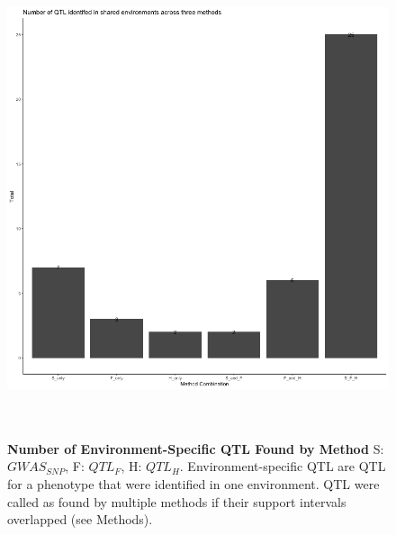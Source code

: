 \documentclass[article,9pt,twocolumn,twoside]{rilabRxiv}
\begin{document}
\begin{figure}[ht]
\centering
\includegraphics[width=\textwidth,height=14cm]{figures/environment_QTL_by_method.png}
\caption{\textbf{Number of Environment-Specific QTL Found by Method} S: $GWAS_{SNP}$, F: $QTL_F$, H: $QTL_H$. Environment-specific QTL are QTL for a phenotype that were identified in one environment. QTL were called as found by multiple methods if their support intervals overlapped (see Methods).}
\label{fig:supfigure2}
\end{figure}
\end{document}
